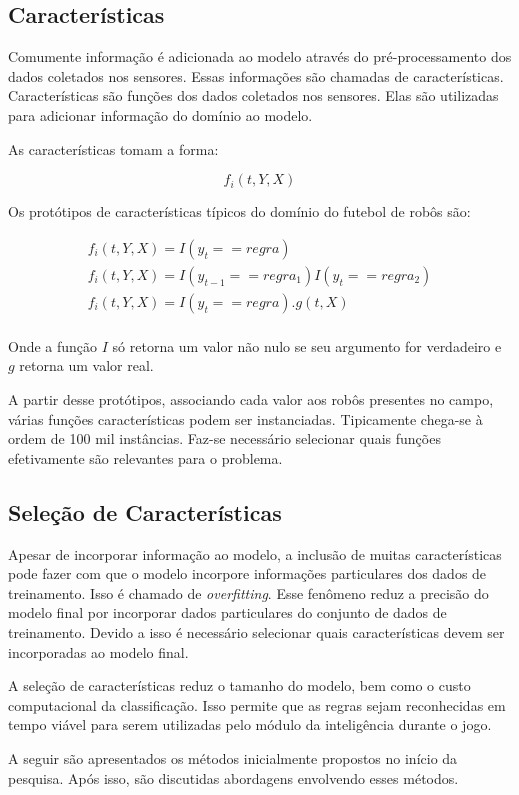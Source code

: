 \subsection{Características}

Comumente informação é adicionada ao modelo através do pré-processamento dos
dados coletados nos sensores. Essas informações são chamadas de características.
Características são funções dos dados coletados nos sensores. Elas são utilizadas
para adicionar informação do domínio ao modelo.

As características tomam a forma:

\begin{centering}
\begin{equation}
f_i(t,Y,X)
\end{equation}
\end{centering}

Os protótipos de características típicos do domínio do futebol de robôs são:

\begin{centering}
\begin{eqnarray}
f_i(t,Y,X)=I(y_t == regra)\\
f_i(t,Y,X)=I(y_{t-1} == regra_1)I(y_t == regra_2)\\
f_i(t,Y,X)=I(y_t == regra).g(t,X)\\
\end{eqnarray}
\end{centering}

Onde a função $I$ só retorna um valor não nulo se seu argumento for verdadeiro e
$g$ retorna um valor real.

A partir desse protótipos, associando cada valor aos robôs presentes
no campo, várias funções características podem ser instanciadas.
Tipicamente chega-se à ordem de 100 mil instâncias. Faz-se necessário
selecionar quais funções efetivamente são relevantes para o problema.

\subsection{Seleção de Características}

Apesar de incorporar informação ao modelo, a inclusão de muitas características
pode fazer com que o modelo incorpore informações particulares dos dados de
treinamento. Isso é chamado de \textit{overfitting}. Esse fenômeno reduz a precisão
do modelo final por incorporar dados particulares do conjunto de dados de
treinamento. Devido a isso é necessário selecionar quais características devem
ser incorporadas ao modelo final.

A seleção de características reduz o tamanho do modelo, bem como o custo
computacional da classificação. Isso permite que as regras sejam reconhecidas
em tempo viável para serem utilizadas pelo módulo da inteligência durante o
jogo.

A seguir são apresentados os métodos inicialmente propostos
no início da pesquisa. Após isso, são discutidas abordagens envolvendo
esses métodos.
